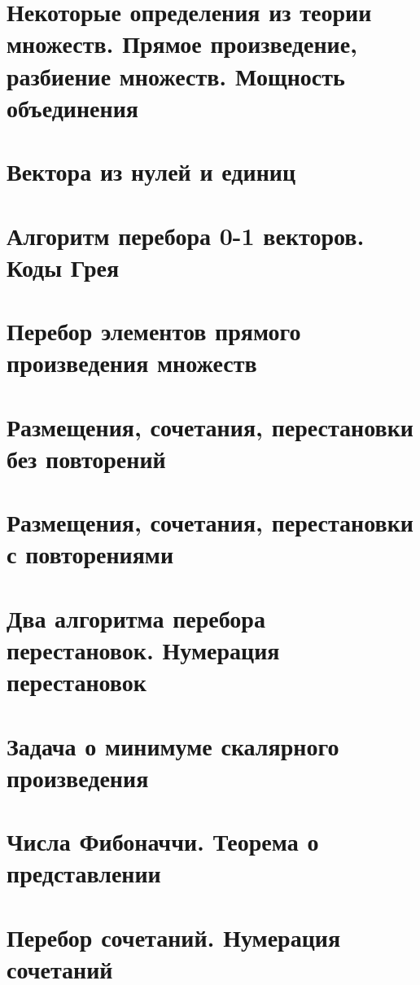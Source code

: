 \documentclass[12pt, fleqn]{article}
\begin{document}

\section{Некоторые определения из теории множеств. Прямое произведение, разбиение множеств. Мощность объединения}


\section{Вектора из нулей и единиц}


\section{Алгоритм перебора 0-1 векторов. Коды Грея}


\section{Перебор элементов прямого произведения множеств}


\section{Размещения, сочетания, перестановки без повторений}


\section{Размещения, сочетания, перестановки с повторениями}


\section{Два алгоритма перебора перестановок. Нумерация перестановок}


\section{Задача о минимуме скалярного произведения}


\section{Числа Фибоначчи. Теорема о представлении}


\section{Перебор сочетаний. Нумерация сочетаний}
\end{document}
